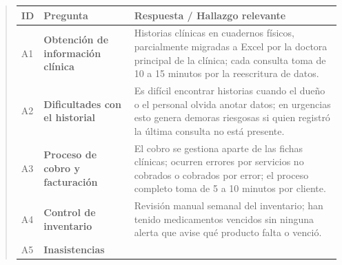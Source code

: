 \documentclass[
]{article}
\newcounter{none} %
\begin{document}
\begin{quote}
{\def\LTcaptype{none} %
\begin{longtable}[]{|
  >{\centering\arraybackslash}p{}|
  >{\raggedright\arraybackslash}p{}|
  >{\raggedright\arraybackslash}p{}|}
\hline
\begin{minipage}[b]{\linewidth}\centering
\textbf{ID}
\end{minipage} & \begin{minipage}[b]{\linewidth}\centering
\textbf{Pregunta}
\end{minipage} & \begin{minipage}[b]{\linewidth}\raggedright
\textbf{Respuesta / Hallazgo relevante}
\end{minipage} \\
\hline
\endhead
\hline
\endlastfoot
A1 & \textbf{Obtención de información clínica} &
\begin{minipage}[t]{\linewidth}\raggedright
Historias clínicas en cuadernos físicos, parcialmente migradas a Excel por la doctora principal de la clínica; cada consulta toma de 10 a 15 minutos por la reescritura de datos.
\end{minipage} \\
\hline
A2 & \textbf{Dificultades con el historial} &
\begin{minipage}[t]{\linewidth}\raggedright
Es difícil encontrar historias cuando el dueño o el personal olvida anotar datos; en urgencias esto genera demoras riesgosas si quien registró la última consulta no está presente.
\end{minipage} \\
\hline
A3 & \textbf{Proceso de cobro y facturación} &
\begin{minipage}[t]{\linewidth}\raggedright
El cobro se gestiona aparte de las fichas clínicas; ocurren errores por servicios no cobrados o cobrados por error; el proceso completo toma de 5 a 10 minutos por cliente.
\end{minipage} \\
\hline
A4 & \textbf{Control de inventario} &
\begin{minipage}[t]{\linewidth}\raggedright
Revisión manual semanal del inventario; han tenido medicamentos vencidos sin ninguna alerta que avise qué producto falta o venció.
\end{minipage} \\
\hline
A5 & \textbf{Inasistencias} &
\begin{minipage}[t]{\linewidth}\raggedright

\end{minipage}
\end{longtable}}
\end{quote}
\end{document}

